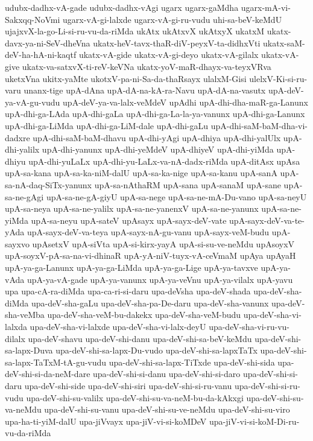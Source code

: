 {udubx-dadhx-vA-gade
udubx-dadhx-vAgi
ugarx
ugarx-gaMdha
ugarx-mA-vi-Sakxqq-NoVmi
ugarx-vA-gi-lalxde
ugarx-vA-gi-ru-vudu
uhi-sa-beV-keMdU
ujajxvX-la-go-Li-si-ru-vu-da-riMda
ukAtx
ukAtxvX
ukAtxyX
ukatxM
ukatx-davx-ya-ni-SeV-dheVna
ukatx-heV-tavx-thaR-diV-peyxV-ta-didhxVti
ukatx-saM-deV-ha-hA-ni-kaqtf
ukatx-vA-gide
ukatx-vA-gi-deyo
ukatx-vA-gilalx
ukatx-vA-give
ukatx-va-satxvX-ti-reV-keVNa
ukatx-yoV-maR-dhayx-va-teyxVRva
uketxVna
ukitx-yaMte
ukotxV-pa-ni-Sa-da-thaRsayx
ulalxM-Gisi
ulelxV-Ki-si-ru-varu
unanx-tige
upA-dAna
upA-dA-na-kA-ra-Navu
upA-dA-na-vasutx
upA-deV-ya-vA-gu-vudu
upA-deV-ya-va-lalx-veMdeV
upAdhi
upA-dhi-dha-maR-ga-Lanunx
upA-dhi-ga-LAda
upA-dhi-gaLa
upA-dhi-ga-La-la-ya-vanunx
upA-dhi-ga-Lanunx
upA-dhi-ga-LiMda
upA-dhi-ga-LiM-dale
upA-dhi-gaLu
upA-dhi-saM-baM-dha-vi-dadxre
upA-dhi-saM-baM-dhavu
upA-dhi-yAgi
upA-dhiya
upA-dhi-yalUlx
upA-dhi-yalilx
upA-dhi-yanunx
upA-dhi-yeMdeV
upA-dhiyeV
upA-dhi-yiMda
upA-dhiyu
upA-dhi-yuLaLx
upA-dhi-yu-LaLx-va-nA-dadx-riMda
upA-ditAsx
upAsa
upA-sa-kana
upA-sa-ka-niM-dalU
upA-sa-ka-nige
upA-sa-kanu
upA-sanA
upA-sa-nA-daq-SiTx-yanunx
upA-sa-nAthaRM
upA-sana
upA-sanaM
upA-sane
upA-sa-ne-gAgi
upA-sa-ne-gA-giyU
upA-sa-nege
upA-sa-ne-mA-Du-vano
upA-sa-neyU
upA-sa-neya
upA-sa-ne-yalilx
upA-sa-ne-yanenxV
upA-sa-ne-yanunx
upA-sa-ne-yiMda
upA-sa-neyu
upA-sateV
upAsayx
upA-sayx-deV-vate
upA-sayx-deV-va-te-yAda
upA-sayx-deV-va-teya
upA-sayx-nA-gu-vanu
upA-sayx-veM-budu
upA-sayxvo
upAsetxV
upA-siVta
upA-si-kirx-yayA
upA-si-su-ve-neMdu
upAsoyxV
upA-soyxV-pA-sa-na-vi-dhinaR
upA-yA-niV-tuyx-vA-ceVmaM
upAya
upAyaH
upA-ya-ga-Lanunx
upA-ya-ga-LiMda
upA-ya-ga-Lige
upA-ya-tavxve
upA-ya-vAda
upA-ya-vA-gade
upA-ya-vanunx
upA-ya-veVnu
upA-ya-vilalx
upA-yavu
upa
upa-cA-ra-diMda
upa-ca-ri-si-daru
upa-deVsha
upa-deV-shada
upa-deV-sha-diMda
upa-deV-sha-gaLu
upa-deV-sha-pa-De-daru
upa-deV-sha-vanunx
upa-deV-sha-veMba
upa-deV-sha-veM-bu-dakekx
upa-deV-sha-veM-budu
upa-deV-sha-vi-lalxda
upa-deV-sha-vi-lalxde
upa-deV-sha-vi-lalx-deyU
upa-deV-sha-vi-ru-vu-dilalx
upa-deV-shavu
upa-deV-shi-danu
upa-deV-shi-sa-beV-keMdu
upa-deV-shi-sa-lapx-Duva
upa-deV-shi-sa-lapx-Du-vudo
upa-deV-shi-sa-lapxTaTx
upa-deV-shi-sa-lapx-TaTxM-tA-gu-vudu
upa-deV-shi-sa-lapx-TiTxde
upa-deV-shi-sida
upa-deV-shi-si-da-neM-dare
upa-deV-shi-si-danu
upa-deV-shi-si-daro
upa-deV-shi-si-daru
upa-deV-shi-side
upa-deV-shi-siri
upa-deV-shi-si-ru-vanu
upa-deV-shi-si-ru-vudu
upa-deV-shi-su-valilx
upa-deV-shi-su-va-neM-bu-da-kAkxgi
upa-deV-shi-su-va-neMdu
upa-deV-shi-su-vanu
upa-deV-shi-su-ve-neMdu
upa-deV-shi-su-viro
upa-ha-ti-yiM-dalU
upa-jiVvayx
upa-jiV-vi-si-koMDeV
upa-jiV-vi-si-koM-Di-ru-vu-da-riMda
}
